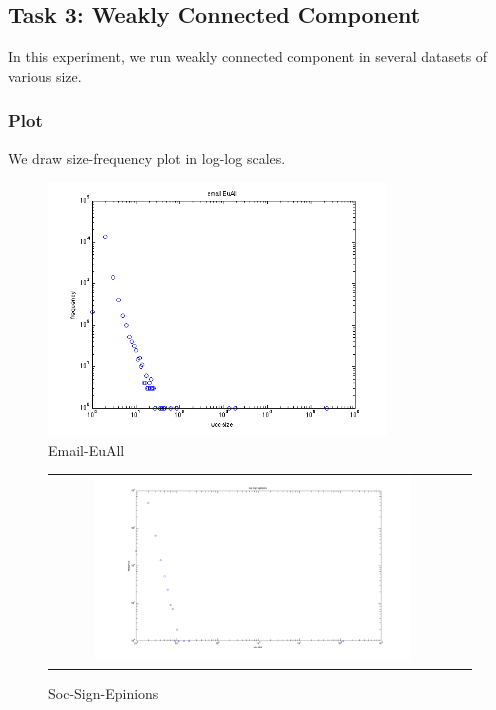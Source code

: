 \subsection{Task 3: Weakly Connected Component}
In this experiment, we run weakly connected component in several datasets of various size.

\subsubsection{Plot}
We draw size-frequency plot in log-log scales.
\begin{figure}[h]
\begin{center}
     \includegraphics[width=0.8\textwidth]{FIG/t3_email_euall.png} 
\caption{Email-EuAll }
\label{t3:1}
\end{center}
\end{figure}

\begin{figure}[h]
\begin{center}
\begin{tabular}{cc}
     \includegraphics[width=0.8\textwidth]{FIG/t3_soc_sign_epinions.png} 
\end{tabular}
\caption{Soc-Sign-Epinions}
\label{t3:2}
\end{center}
\end{figure}


